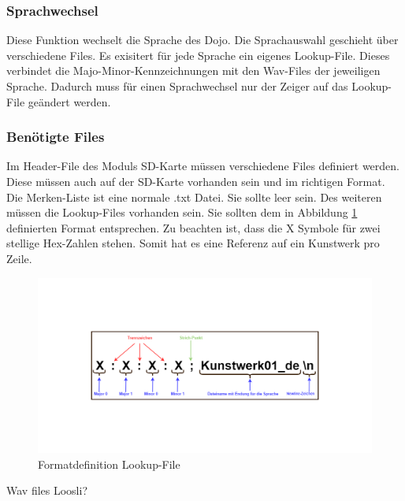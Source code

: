 \subsubsection*{Sprachwechsel}
Diese Funktion wechselt die Sprache des Dojo. Die Sprachauswahl geschieht über verschiedene Files. Es exisitert für jede Sprache ein eigenes Lookup-File. Dieses verbindet die Majo-Minor-Kennzeichnungen mit den Wav-Files der jeweiligen Sprache. Dadurch muss für einen Sprachwechsel nur der Zeiger auf das Lookup-File geändert werden.

\subsubsection{Benötigte Files}
Im Header-File des Moduls SD-Karte müssen verschiedene Files definiert werden. Diese müssen auch auf der SD-Karte vorhanden sein und im richtigen Format. Die Merken-Liste ist eine normale .txt Datei. Sie sollte leer sein. Des weiteren müssen die Lookup-Files vorhanden sein. Sie sollten dem in Abbildung \ref{fig:definition_lookup_file} definierten Format entsprechen. Zu beachten ist, dass die X Symbole für zwei stellige Hex-Zahlen stehen. Somit hat es eine Referenz auf ein Kunstwerk pro Zeile.

\begin{figure}[H]
	\begin{center}
		\includegraphics[width=140mm]{data/Definition_picture.png}
		\caption[Formatdefinition Lookup-File]{Formatdefinition Lookup-File} %
		\label{fig:definition_lookup_file}
	\end{center}
\end{figure}

Wav files Loosli?

